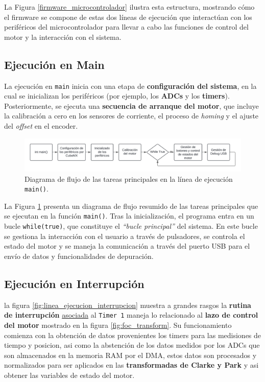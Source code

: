 \documentclass[11pt]{report}
\begin{document}
La Figura \ref{firmware_microcontrolador} ilustra esta estructura, mostrando cómo el firmware se compone de estas dos líneas de ejecución que interactúan con los periféricos del microcontrolador para llevar a cabo las funciones de control del motor y la interacción con el sistema.


\subsection{Ejecución en Main}

La ejecución en \texttt{main} inicia con una etapa de \textbf{configuración del sistema}, en la cual se inicializan los periféricos (por ejemplo, los \textbf{ADCs} y los \textbf{timers}). Posteriormente, se ejecuta una \textbf{secuencia de arranque del motor}, que incluye la calibración a cero en los sensores de corriente, el proceso de \emph{homing} y el ajuste del \emph{offset} en el encoder.

\begin{figure}[ht]
	\centering
	\includegraphics[width=\textwidth]{imagenes/Diagramas/linea main.png}
	\caption{Diagrama de flujo de las tareas principales en la línea de ejecución \texttt{main()}.}
	\label{fig:linea_ejecucion_main}
\end{figure}
\FloatBarrier

La Figura \ref{fig:linea_ejecucion_main} presenta un diagrama de flujo resumido de las tareas principales que se ejecutan en la función \texttt{main()}. Tras la inicialización, el programa entra en un bucle \texttt{while(true)}, que constituye el \emph{``bucle principal''} del sistema. En este bucle se gestiona la interacción con el usuario a través de pulsadores, se controla el estado del motor y se maneja la comunicación a través del puerto USB para el envío de datos y funcionalidades de depuración.

\subsection{Ejecución en Interrupción}

la figura \ref{fig:linea_ejecucion_interrupcion} muestra a grandes rasgos la \textbf{rutina de interrupción} \href{https://www.youtube.com/watch?v=RJX_jYm8T84}{asociada} al \texttt{Timer 1} maneja lo relacionado al \textbf{lazo de control del motor} mostrado en la figura \ref{fig:foc_transform}. Su funcionamiento comienza con la obtención de datos provenientes los timers para las medisiones de tiempo y posicion, asi como la abstención de los datos medidos por los ADCs que son almacenados en la memoria RAM por el DMA, estos datos son procesados y normalizados para ser aplicados en las \textbf{transformadas de Clarke y Park} y asi obtener las variables de estado del motor.
\end{document}
